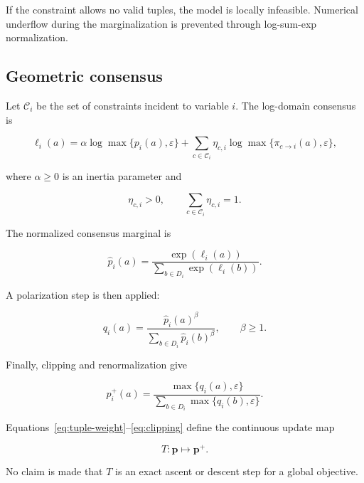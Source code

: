 \documentclass[pdflatex,sn-mathphys-num,iicol,oneside]{sn-jnl}
\begin{document}
If the constraint allows no valid tuples, the model is locally infeasible. Numerical underflow during the marginalization is prevented through log-sum-exp normalization.

\subsection{Geometric consensus}

Let $\mathcal{C}_i$ be the set of constraints incident to variable
$i$. The log-domain consensus is

\begin{equation}
\ell_i(a)
=
\alpha\log\max\{p_i(a),\varepsilon\}
+
\sum_{c\in\mathcal{C}_i}
\eta_{c,i}
\log\max\{\pi_{c\rightarrow i}(a),\varepsilon\},
\label{eq:consensus}
\end{equation}

where $\alpha\geq 0$ is an inertia parameter and

\begin{equation}
\eta_{c,i}>0,
\qquad
\sum_{c\in\mathcal{C}_i}\eta_{c,i}=1.
\end{equation}

The normalized consensus marginal is

\begin{equation}
\widehat{p}_i(a)
=
\frac{\exp(\ell_i(a))}
{\sum_{b\in D_i}\exp(\ell_i(b))}.
\end{equation}

A polarization step is then applied:

\begin{equation}
q_i(a)
=
\frac{\widehat{p}_i(a)^{\beta}}
{\sum_{b\in D_i}\widehat{p}_i(b)^{\beta}},
\qquad \beta\geq 1.
\label{eq:polarization}
\end{equation}

Finally, clipping and renormalization give

\begin{equation}
p_i^{+}(a)
=
\frac{\max\{q_i(a),\varepsilon\}}
{\sum_{b\in D_i}\max\{q_i(b),\varepsilon\}}.
\label{eq:clipping}
\end{equation}

Equations~\eqref{eq:tuple-weight}--\eqref{eq:clipping} define the
continuous update map

\begin{equation}
T:\bm{p}\mapsto\bm{p}^{+}.
\end{equation}

No claim is made that $T$ is an exact ascent or descent step for a
global objective.
\end{document}
